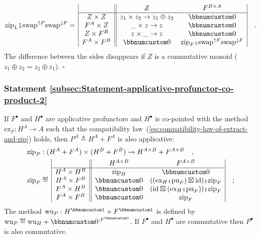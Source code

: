 \[
\text{zip}_{L}\bef\text{swap}^{\uparrow P}\text{swap}^{\downarrow P}=\,\begin{array}{|c||cc|}
 & Z & F^{B\times A}\\
\hline Z\times Z & z_{1}\times z_{2}\rightarrow z_{1}\oplus z_{2} & \bbnum 0\\
F^{A}\times Z & \_\times z\rightarrow z & \bbnum 0\\
Z\times F^{B} & z\times\_\rightarrow z & \bbnum 0\\
F^{A}\times F^{B} & \bbnum 0 & \text{zip}_{F}\bef\text{swap}^{\uparrow F}\text{swap}^{\downarrow F}
\end{array}\quad.
\]
The difference between the sides disappears if $Z$ is a commutative
monoid ($z_{1}\oplus z_{2}=z_{2}\oplus z_{1}$). $\square$

\subsubsection{Statement \label{subsec:Statement-applicative-profunctor-co-product-2}\ref{subsec:Statement-applicative-profunctor-co-product-2}}

If $F^{\bullet}$ and $H^{\bullet}$ are applicative profunctors and
$H^{\bullet}$ is co-pointed with the method $\text{ex}_{F}:H^{A}\rightarrow A$
such that the compatibility law~(\ref{eq:compatibility-law-of-extract-and-zip})
holds, then $P^{A}\triangleq H^{A}+F^{A}$ is also applicative:
\begin{align*}
 & \text{zip}_{P}:(H^{A}+F^{A})\times(H^{B}+F^{B})\rightarrow H^{A\times B}+F^{A\times B}\quad,\\
 & \text{zip}_{P}\triangleq\,\begin{array}{|c||cc|}
 & H^{A\times B} & F^{A\times B}\\
\hline H^{A}\times H^{B} & \text{zip}_{H} & \bbnum 0\\
H^{A}\times F^{B} & \bbnum 0 & ((\text{ex}_{H}\bef\text{pu}_{F})\boxtimes\text{id})\bef\text{zip}_{F}\\
F^{A}\times H^{B} & \bbnum 0 & (\text{id}\boxtimes(\text{ex}_{H}\bef\text{pu}_{F}))\bef\text{zip}_{F}\\
F^{A}\times F^{B} & \bbnum 0 & \text{zip}_{F}
\end{array}\quad;
\end{align*}
The method $\text{wu}_{P}:H^{\bbnum 1}+F^{\bbnum 1}$ is defined by
$\text{wu}_{P}\triangleq\text{wu}_{H}+\bbnum 0^{:F^{\bbnum 1}}$.
If $F^{\bullet}$ and $H^{\bullet}$ are commutative then $P^{\bullet}$
is also commutative.

